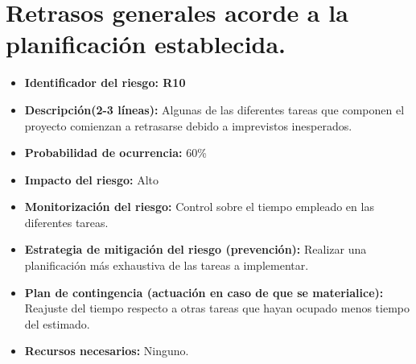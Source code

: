 \documentclass[a4paper,12pt,oneside]{article}
\begin{document}
\section*{Retrasos generales acorde a la planificación establecida.}
\begin{itemize}
	\item \textbf{Identificador del riesgo: R10}
	\item \textbf{Descripción(2-3 líneas): } Algunas de las diferentes tareas que componen el proyecto comienzan a retrasarse debido a imprevistos inesperados.
	\item \textbf{Probabilidad de ocurrencia: } 60\%
	\item \textbf{Impacto del riesgo: } Alto
	\item \textbf{Monitorización del riesgo: } Control sobre el tiempo empleado en las diferentes tareas.
	\item \textbf{Estrategia de mitigación del riesgo (prevención): } Realizar una planificación más exhaustiva de las tareas a implementar.
	\item \textbf{Plan de contingencia (actuación en caso de que se materialice): } Reajuste del tiempo respecto a otras tareas que hayan ocupado menos tiempo del estimado.
	\item \textbf{Recursos necesarios: } Ninguno.
\end{itemize} 











\end{document}
